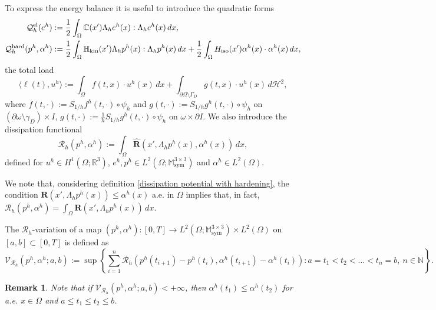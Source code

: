 \documentclass[reqno,10pt]{amsart}
\numberwithin{equation}{section}
\newtheorem{remark}[theorem]{Remark}
\theoremstyle{remark}
\newcommand{\C}{\mathbb{C}}
\newcommand{\calH}{\mathcal{H}}
\newcommand{\M}{\mathbb{M}}
\newcommand{\N}{\mathbb{N}}
\newcommand{\calQ}{\mathcal{Q}}
\newcommand{\R}{\mathbb{R}}
\newcommand{\calR}{\mathcal{R}}
\newcommand{\calV}{\mathcal{V}}
\DeclareMathOperator{\sym}{sym}
\newcommand{\fvol}{f}
\newcommand{\fsurf}{g}
\newcommand{\Dir}{D}
\newcommand{\scaling}{{S}}
\newcommand{\Hkin}{\mathbb{H}_{\rm kin}}
\newcommand{\Hiso}{H_{\rm iso}}
\newcommand{\disspot}{\mathbf{R}}
\newcommand{\gendisspot}{\widehat{\disspot}}
\begin{document}
To express the energy balance it is useful to introduce the quadratic forms
\begin{align}
	\calQ^{\rm el}_{h}(e^h) & := \frac{1}{2} \int_{\Omega} \C(x') \Lambda_h e^h(x) : \Lambda_h e^h(x) \,dx, \label{definition Q^el_h}\\
	\calQ^{\rm hard}_{h}(p^h, \alpha^h) & := \frac{1}{2} \int_{\Omega} \Hkin(x') \Lambda_h p^h(x) : \Lambda_h p^h(x) \,dx + \frac{1}{2} \int_{\Omega} \Hiso(x') \alpha^h(x) \cdot \alpha^h(x) \,dx, \label{definition Q^hard_h}
\end{align}
the total load
\begin{equation} \label{definition ell}
	\big\langle \ell(t), u^h \big\rangle := \int_{\Omega} \fvol(t,x) \cdot u^h(x) \,dx + \int_{\partial{\Omega} \setminus \Gamma_\Dir} \fsurf(t,x) \cdot u^h(x) \,d\calH^{2},
\end{equation}
where $\fvol(t,\cdot):=\scaling_{1/h}\fvol^h(t, \cdot) \circ \psi_h$ and $\fsurf(t,\cdot):=\scaling_{1/h}\fsurf^h(t, \cdot) \circ \psi_h$ on $(\partial \omega \setminus \gamma_D) \times I$, $\fsurf(t,\cdot):=\frac{1}{h}\scaling_{1/h}\fsurf^h(t, \cdot) \circ \psi_h$ on $\omega \times \partial I$.
We also introduce the dissipation functional
\begin{equation} \label{definition R_h}
	\calR_{h}(p^h, \alpha^h) := \int_{\Omega} \gendisspot(x', \Lambda_h p^h(x), \alpha^h(x)) \,dx,
\end{equation}
defined for $u^h \in H^1(\Omega;\R^3)$, $e^h, p^h \in L^2(\Omega;\M^{3 \times 3}_{\sym})$ and $\alpha^h \in L^2(\Omega)$.

We note that, considering definition \eqref{dissipation potential with hardening}, the condition $\disspot(x', \Lambda_h p^h(x)) \leq \alpha^h(x)$ a.e. in $\Omega$ implies that, in fact, $\calR_{h}(p^h, \alpha^h) = \int_{\Omega} \disspot(x', \Lambda_h p^h(x)) \,dx$.

The $\calR_{h}$-variation of a map $(p^h, \alpha^h) : [0,T] \to L^2(\Omega;\M^{3 \times 3}_{\sym}) \times L^2(\Omega)$ on $[a,b]\subset[0,T]$ is defined as
\begin{equation*}
	\calV_{\calR_{h}}(p^h, \alpha^h; a, b) := \sup\left\{ \sum_{i = 1}^{n} \calR_{h}\!\left(p^h(t_{i+1}) - p^h(t_i), \alpha^h(t_{i+1}) - \alpha^h(t_i)\right) : a = t_1 < t_2 < \ldots < t_n = b,\ n \in \N \right\}.
\end{equation*}
\begin{remark} \label{remupozo1} 
Note that if $ \calV_{\calR_{h}}(p^h, \alpha^h; a, b)<+\infty$, then $\alpha^h(t_1)\leq \alpha^h(t_2)$ for a.e. $x \in \Omega$ and $a\leq t_1 \leq t_2\leq b$.
\end{remark}
\end{document}
